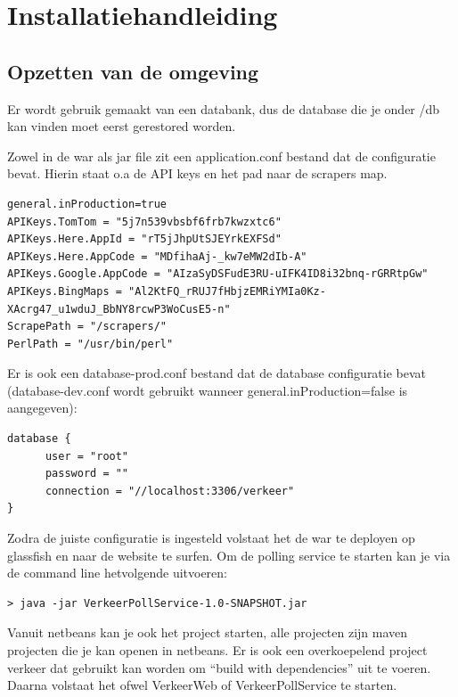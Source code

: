 \documentclass[a4paper]{article}
\begin{document}
\section{Installatiehandleiding}
\label{sec:installatiehandleiding}

\subsection{Opzetten van de omgeving}

Er wordt gebruik gemaakt van een databank, dus de database die je onder /db kan vinden moet eerst gerestored worden. 

Zowel in de war als jar file zit een application.conf bestand dat de configuratie bevat. Hierin staat o.a de API keys en het pad naar de scrapers map. 

\begin{lstlisting}
general.inProduction=true
APIKeys.TomTom = "5j7n539vbsbf6frb7kwzxtc6"
APIKeys.Here.AppId = "rT5jJhpUtSJEYrkEXFSd"
APIKeys.Here.AppCode = "MDfihaAj-_kw7eMW2dIb-A"
APIKeys.Google.AppCode = "AIzaSyDSFudE3RU-uIFK4ID8i32bnq-rGRRtpGw"
APIKeys.BingMaps = "Al2KtFQ_rRUJ7fHbjzEMRiYMIa0Kz-XAcrg47_u1wduJ_BbNY8rcwP3WoCusE5-n"
ScrapePath = "/scrapers/"
PerlPath = "/usr/bin/perl"
\end{lstlisting}

Er is ook een database-prod.conf bestand dat de database configuratie bevat (database-dev.conf wordt gebruikt wanneer general.inProduction=false is aangegeven):

\begin{lstlisting}
database {  
      user = "root"
      password = ""
      connection = "//localhost:3306/verkeer"
}
\end{lstlisting}

Zodra de juiste configuratie is ingesteld volstaat het de war te deployen op glassfish en naar de website te surfen. Om de polling service te starten kan je via de command line hetvolgende uitvoeren:

\begin{lstlisting}
> java -jar VerkeerPollService-1.0-SNAPSHOT.jar
\end{lstlisting}

Vanuit netbeans kan je ook het project starten, alle projecten zijn maven projecten die je kan openen in netbeans. Er is ook een overkoepelend project verkeer dat gebruikt kan worden om ``build with dependencies'' uit te voeren. Daarna volstaat het ofwel VerkeerWeb of VerkeerPollService te starten.
\end{document}
